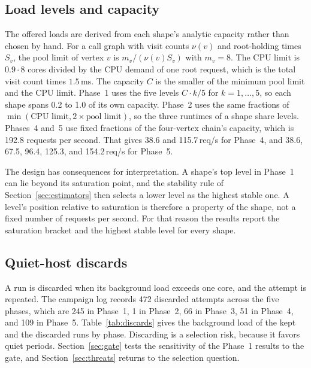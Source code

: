 

\subsection{Load levels and capacity}

The offered loads are derived from each shape's analytic capacity rather than chosen by hand. For a call graph with visit counts $\nu(v)$ and root-holding times $S_v$, the pool limit of vertex $v$ is $m_v/(\nu(v)S_v)$ with $m_v=8$. The CPU limit is $0.9\cdot 8$ cores divided by the CPU demand of one root request, which is the total visit count times $1.5\,\mathrm{ms}$. The capacity $C$ is the smaller of the minimum pool limit and the CPU limit. Phase~1 uses the five levels $C\cdot k/5$ for $k=1,\ldots,5$, so each shape spans 0.2 to 1.0 of its own capacity. Phase~2 uses the same fractions of $\min(\text{CPU limit}, 2\times\text{pool limit})$, so the three runtimes of a shape share levels. Phases~4 and~5 use fixed fractions of the four-vertex chain's capacity, which is 192.8 requests per second. That gives 38.6 and 115.7\,req/s for Phase~4, and 38.6, 67.5, 96.4, 125.3, and 154.2\,req/s for Phase~5.

The design has consequences for interpretation. A shape's top level in Phase~1 can lie beyond its saturation point, and the stability rule of Section~\ref{sec:estimators} then selects a lower level as the highest stable one. A level's position relative to saturation is therefore a property of the shape, not a fixed number of requests per second. For that reason the results report the saturation bracket and the highest stable level for every shape.

\subsection{Quiet-host discards}

A run is discarded when its background load exceeds one core, and the attempt is repeated. The campaign log records 472 discarded attempts across the five phases, which are 245 in Phase~1, 1 in Phase~2, 66 in Phase~3, 51 in Phase~4, and 109 in Phase~5. Table~\ref{tab:discards} gives the background load of the kept and the discarded runs by phase. Discarding is a selection risk, because it favors quiet periods. Section~\ref{sec:gate} tests the sensitivity of the Phase~1 results to the gate, and Section~\ref{sec:threats} returns to the selection question.



